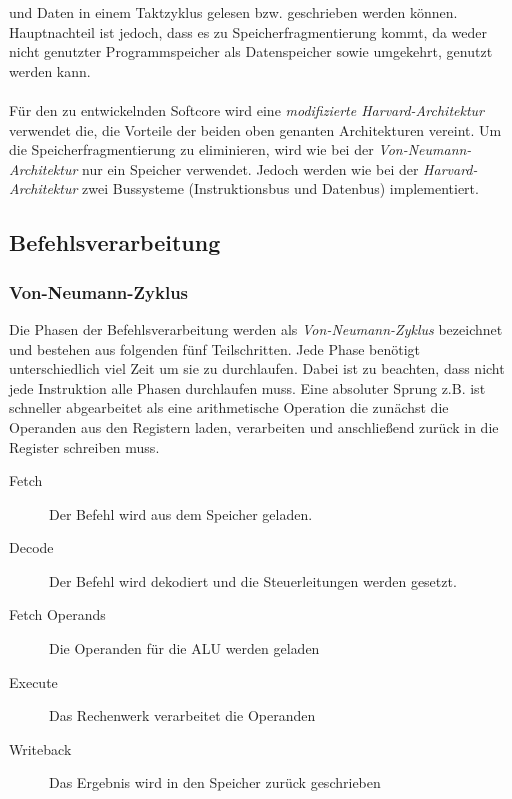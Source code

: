             und Daten in einem Taktzyklus gelesen bzw. geschrieben werden können. Hauptnachteil ist jedoch,
            dass es zu Speicherfragmentierung kommt, da weder nicht genutzter Programmspeicher als Datenspeicher
            sowie umgekehrt, genutzt werden kann.
            \\\\
            Für den zu entwickelnden Softcore wird eine \textit{modifizierte Harvard-Architektur} verwendet die,
            die Vorteile der beiden oben genanten Architekturen vereint. Um die Speicherfragmentierung zu eliminieren, 
            wird wie bei der \textit{Von-Neumann-Architektur} nur ein Speicher verwendet.
            Jedoch werden wie bei der \textit{Harvard-Architektur} zwei Bussysteme (Instruktionsbus und Datenbus)
            implementiert. 

        \subsection{Befehlsverarbeitung}

            \subsubsection{Von-Neumann-Zyklus}
                Die Phasen der Befehlsverarbeitung werden als \textit{Von-Neumann-Zyklus}
                bezeichnet und bestehen aus folgenden fünf Teilschritten.
                Jede Phase benötigt unterschiedlich viel Zeit um sie zu durchlaufen.
                Dabei ist zu beachten, dass nicht jede Instruktion alle Phasen durchlaufen muss.
                Eine absoluter Sprung z.B. ist schneller abgearbeitet als eine arithmetische
                Operation die zunächst die Operanden aus den Registern laden,
                verarbeiten und anschließend zurück in die Register schreiben muss.
            
                \begin{description}
                    \item[Fetch] Der Befehl wird aus dem Speicher geladen.
                    \item[Decode] Der Befehl wird dekodiert und die Steuerleitungen werden gesetzt.
                    \item[Fetch Operands] Die Operanden für die ALU werden geladen 
                    \item[Execute] Das Rechenwerk verarbeitet die Operanden
                    \item[Writeback] Das Ergebnis wird in den Speicher zurück geschrieben
                \end{description}


